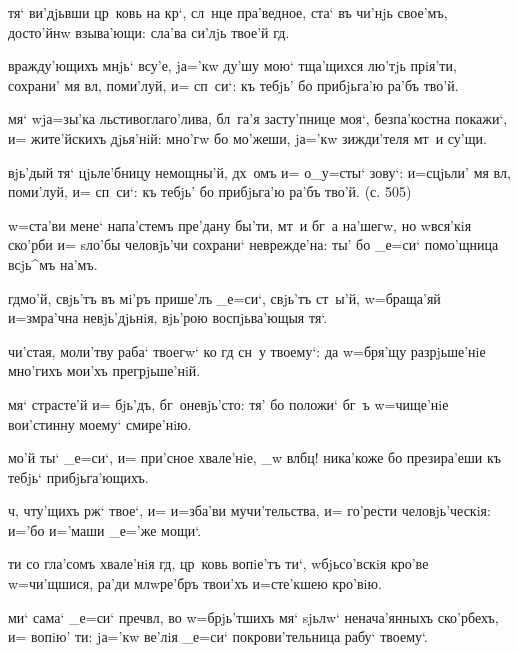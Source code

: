 
 тя` ви'дjьвши цр~ковь на 
кр`, сл~нце пра'ведное, ста` въ чи'нjь свое'мъ, 
досто'йнw взыва'ющи: сла'ва си'лjь твое'й гд.

 вражду'ющихъ мнjь` всу'е, jа='кw ду'шу 
мою` тща'щихся лю'тjь прiя'ти, сохрани' мя вл, 
поми'луй, и= сп~си`: къ тебjь' бо прибjьга'ю ра'бъ тво'й.

 мя` w\т jа=зы'ка льстивоглаго'лива, 
бл~га'я засту'пнице моя`, безпа'костна покажи`, и= 
жите'йскихъ дjья'нiй: мно'гw бо мо'жеши, jа='кw 
зижди'теля мт~и су'щи.

  вjь'дый тя` цjьле'бницу 
немощны'й, дх~омъ и= о_у=сты` зову`: и=сцjьли' мя 
вл, поми'луй, и= сп~си`: къ тебjь' бо прибjьга'ю 
ра'бъ тво'й. (с. 505)

   w=ста'ви мене` напа'стемъ пре'дану 
бы'ти, мт~и бг~а на'шегw, но w\т вся'кiя ско'рби и= 
sло'бы человjь'чи сохрани` неврежде'на: ты' бо _е=си` 
помо'щница всjь^мъ на'мъ.


  гд мо'й, свjь'тъ въ мi'ръ 
прише'лъ _е=си`, свjь'тъ ст~ы'й, w=браща'яй и=з\ъ мра'чна 
невjь'дjьнiя, вjь'рою воспjьва'ющыя тя`.

 чи'стая, моли'тву раба` твоегw` ко гд 
сн~у твоему`: да w=бря'щу разрjьше'нiе мно'гихъ мои'хъ 
прегрjьше'нiй.

 мя` страсте'й и= бjь'дъ, бг~оневjь'сто: 
тя' бо положи` бг~ъ w=чище'нiе вои'стинну моему` 
смире'нiю.

  мо'й ты` _е=си`, и= при'сное 
хвале'нiе, _w вл бц! ника'коже бо презира'еши къ 
тебjь` прибjьга'ющихъ.

   ч, чту'щихъ рж` 
твое`, и= и=зба'ви мучи'тельства, и= го'рести 
человjь'ческiя: и='бо и='маши _е='же мощи`.


 ти со гла'сомъ хвале'нiя гд, 
цр~ковь вопiе'тъ ти`, w\т бjьсо'вскiя кро'ве w=чи'щшися, 
ра'ди мл w\т ре'бръ твои'хъ и=сте'кшею кро'вiю.

 ми` сама` _е=си` преч вл, во 
w=брjь'тшихъ мя` sjьлw` ненача'янныхъ ско'рбехъ, и= 
вопiю' ти: jа='кw ве'лiя _е=си` покрови'тельница рабу` 
твоему`.

